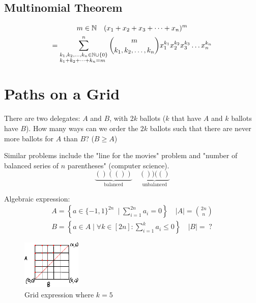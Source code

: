 \documentclass[00_complete]{subfiles}
\begin{document}
\subsection{Multinomial Theorem}

\begin{gather*}
    m \in \mathbb{N} \quad (x_1+x_2+x_3+ \dots + x_n)^m \\
    = \sum_{\begin{subarray}{l}
        k_1,k_2,\dots,k_n \in \mathbb{N} \cup \{0\} \\
        k_1+k_2+\dots+k_n = m
    \end{subarray}}^n
    \binom{m}{k_1,k_2,\dots,k_n}
    x_1^{k_1}x_2^{k_2}x_3^{k_3}\dots x_n^{k_n}
\end{gather*}

\section{Paths on a Grid}
\begin{example}
There are two delegates: $A$ and $B$, with $2k$ ballots ($k$ that have $A$ and
$k$ ballots have $B$). How many ways can we order the $2k$ ballots such that
there are never more ballots for $A$ than $B$? ($B \geq A$)

Similar problems include the "line for the movies" problem and "number of
balanced series of $n$ parentheses" (computer science).
$$\underbrace{()(())}_{\text{balanced}} \quad
\underbrace{())(()}_{\text{unbalanced}}$$

\end{example}
Algebraic expression:
\begin{gather*}
A = \left\{a \in \{-1,1\}^{2n}\ \mid \sum_{i=1}^{2n} a_i = 0\right\} \quad
|A|=\binom{2n}{n} \\
B=\left\{a \in A \mid \forall k \in [2n]: \sum_{i=1}^k a_i \leq 0\right\}
\quad |B|=\;?
\end{gather*}

\begin{figure}[ht!]
  \centering
    \includegraphics[width=0.25\textwidth]{w6-grid}
    \caption{Grid expression where $k=5$}
\end{figure}
\end{document}
